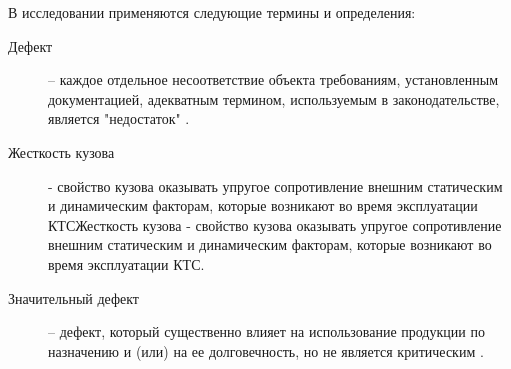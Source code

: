 В исследовании применяются следующие термины и определения:
\begin{description}
	\item
	[Дефект] --  каждое отдельное несоответствие объекта требованиям, установленным документацией, адекватным термином, используемым в законодательстве, является "недостаток" \cite{58197:gost}.
	\item[Жесткость кузова] - свойство кузова оказывать упругое сопротивление
	внешним статическим и динамическим факторам, которые возникают во время эксплуатации КТСЖесткость кузова - свойство кузова оказывать упругое сопротивление 	внешним статическим и динамическим факторам, которые возникают во время эксплуатации КТС.
	\item
	[Значительный дефект] -- дефект, который существенно влияет на использование продукции по 	назначению и (или) на ее долговечность, но не является критическим  \cite{58197:gost}.

\end{description}
